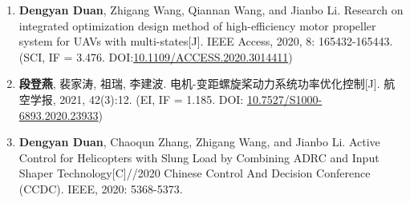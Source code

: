 \begin{enumerate}
  \item \textbf{Dengyan Duan}, Zhigang Wang, Qiannan Wang, and Jianbo Li. Research on integrated optimization design method of high-efficiency motor propeller system for UAVs with multi-states[J]. IEEE Access, 2020, 8: 165432-165443. (SCI, IF = 3.476. DOI:\href{https://doi.org/10.1109/ACCESS.2020.3014411}{10.1109/ACCESS.2020.3014411})
  \item \textbf{段登燕}, 裴家涛, 祖瑞, 李建波. 电机-变距螺旋桨动力系统功率优化控制[J]. 航空学报, 2021, 42(3):12. (EI, IF = 1.185. DOI: \href{https://doi.org/10.7527/S1000-6893.2020.23933}{10.7527/S1000-6893.2020.23933})
  \item \textbf{Dengyan Duan}, Chaoqun Zhang, Zhigang Wang, and Jianbo Li. Active Control for Helicopters with Slung Load by Combining ADRC and Input Shaper Technology[C]//2020 Chinese Control And Decision Conference (CCDC). IEEE, 2020: 5368-5373. 
  

\end{enumerate}
